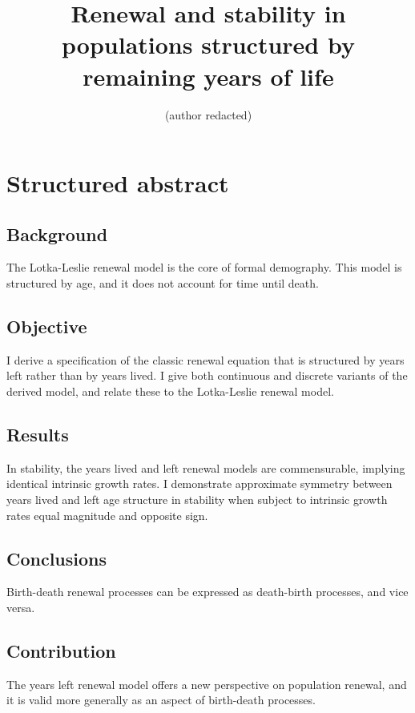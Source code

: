 \documentclass[12pt,oneside,a4paper,leqno]{article}
\newcommand\ackn[1]{%
  \begingroup
  \renewcommand\thefootnote{}\footnote{#1}%
  \addtocounter{footnote}{-1}%
  \endgroup
}
\begin{document}
\title{Renewal and stability in populations structured by remaining years of
life}
\author{(author redacted)}
\maketitle




\section*{Structured abstract}

\subsection*{Background}
The Lotka-Leslie renewal model is the core of formal demography. This model is
structured by age, and it does not account for time until death.

\subsection*{Objective}
I derive a specification of the classic renewal equation that is structured by
years left rather than by years lived. I give both continuous
and discrete variants of the derived model, and relate these to the Lotka-Leslie
renewal model.

\subsection*{Results}
In stability, the years lived and left renewal models are
commensurable, implying identical intrinsic growth rates.
I demonstrate approximate symmetry between years lived and left age structure in
stability when subject to intrinsic growth rates equal magnitude and opposite sign.

\subsection*{Conclusions}
Birth-death renewal processes can be expressed as death-birth processes, and
vice versa.

\subsection*{Contribution}
The years left renewal model offers a new perspective on population renewal,
and it is valid more generally as an aspect of birth-death processes.
\vspace{2cm}
\end{document}
